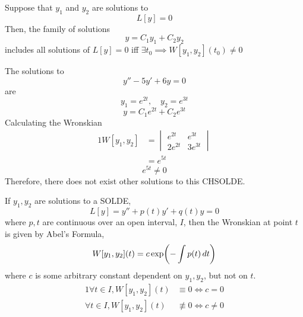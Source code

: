 \documentclass[twoside]{report}
\begin{document}
    \begin{btheorem}
        Suppose that $y_{1}$ and $y_{2}$ are solutions to
        \begin{equation}
            L[y] = 0
        \end{equation}
        Then, the family of solutions
        \begin{equation}
            y=C_{1}y_{1} + C_{2}y_{2}
        \end{equation}
        includes all solutions of $L[y] = 0$ iff $\exists t_{0} \implies W[y_{1}, y_{2}](t_{0}) \neq 0$
    \end{btheorem}
    \np
    \begin{example}[Application of 10.2]
        The solutions to
        \begin{equation}
            y'' - 5y' + 6y = 0
        \end{equation}
        are
        \begin{equation}
            y_{1} = e^{2t},\quad y_{2} = e^{3t}
        \end{equation}
        \begin{equation}
            y = C_{1}e^{2t} + C_{2}e^{3t}
        \end{equation}
        Calculating the Wronskian
        \begin{alignat}{1}
            W[y_{1}, y_{2}] &= \begin{vmatrix}
                e^{2t} & e^{3t}\\
                2e^{2t} & 3e^{3t}
            \end{vmatrix}\\
            &= e^{5t}
        \end{alignat}
        \begin{equation}
            e^{5t} \neq 0
        \end{equation}
        Therefore, there does not exist other solutions to this CHSOLDE.
    \end{example}
    \begin{btheorem}
        If $y_{1}, y_{2}$ are solutions to a SOLDE,
        \begin{equation}
            L[y] = y'' + p(t)y' + q(t)y = 0
        \end{equation}
        where $p, t$ are continuous over an open interval, $I$, then the Wronskian at point $t$ is given by Abel's Formula,
        \begin{equation}
            W[y_{1}, y_{2}](t) = c\exp\bbbp{-\int p(t)\,dt}
        \end{equation}
        where $c$ is some arbitrary constant dependent on $y_{1}, y_{2}$, but not on $t$.
        \begin{alignat}{1}
            \forall t\in I, W[y_{1}, y_{2}](t) &\equiv 0 \iff c = 0\\
            \forall t\in I, W[y_{1}, y_{2}](t) &\nequiv 0 \iff c \neq 0
        \end{alignat}
    \end{btheorem}
\end{document}
